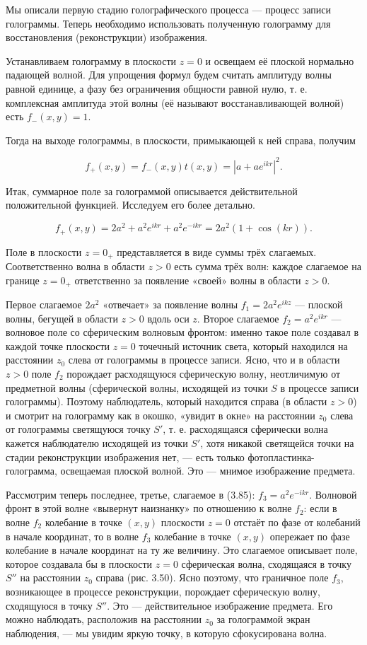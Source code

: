 \documentclass[a4paper,12pt]{article}
\begin{document}
Мы описали первую стадию голографического процесса — процесс записи голограммы. Теперь необходимо использовать полученную голограмму для восстановления (реконструкции) изображения.

Устанавливаем голограмму в плоскости \( z = 0 \) и освещаем её плоской нормально падающей волной. Для упрощения формул будем считать амплитуду волны равной единице, а фазу без ограничения общности равной нулю, т. е. комплексная амплитуда этой волны (её называют восстанавливающей волной) есть \( f_-(x,y) = 1 \).

Тогда на выходе голограммы, в плоскости, примыкающей к ней справа, получим

\[ f_+(x,y) = f_-(x,y) t(x,y) = |a + a e^{ikr}|^2. \]

Итак, суммарное поле за голограммой описывается действительной положительной функцией. Исследуем его более детально.

\[ f_+(x,y) = 2a^2 + a^2 e^{ikr} + a^2 e^{-ikr} = 2a^2 (1 + \cos(kr)). \]

Поле в плоскости \( z = 0_+ \) представляется в виде суммы трёх слагаемых. Соответственно волна в области \( z > 0 \) есть сумма трёх волн: каждое слагаемое на границе \( z = 0_+ \) ответственно за появление «своей» волны в области \( z > 0 \).

Первое слагаемое \( 2a^2 \) «отвечает» за появление волны \( f_1 = 2a^2 e^{ikz} \) — плоской волны, бегущей в области \( z > 0 \) вдоль оси \( z \). Второе слагаемое \( f_2 = a^2 e^{ikr} \) — волновое поле со сферическим волновым фронтом: именно такое поле создавал в каждой точке плоскости \( z = 0 \) точечный источник света, который находился на расстоянии \( z_0 \) слева от голограммы в процессе записи. Ясно, что и в области \( z > 0 \) поле \( f_2 \) порождает расходящуюся сферическую волну, неотличимую от предметной волны (сферической волны, исходящей из точки \( S \) в процессе записи голограммы). Поэтому наблюдатель, который находится справа (в области \( z > 0 \)) и смотрит на голограмму как в окошко, «увидит в окне» на расстоянии \( z_0 \) слева от голограммы светящуюся точку \( S' \), т. е. расходящаяся сферически волна кажется наблюдателю исходящей из точки \( S' \), хотя никакой светящейся точки на стадии реконструкции изображения нет, — есть только фотопластинка-голограмма, освещаемая плоской волной. Это — мнимое изображение предмета.

Рассмотрим теперь последнее, третье, слагаемое в (3.85): \( f_3 = a^2 e^{-ikr} \). Волновой фронт в этой волне «вывернут наизнанку» по отношению к волне \( f_2 \): если в волне \( f_2 \) колебание в точке \((x,y)\) плоскости \( z = 0 \) отстаёт по фазе от колебаний в начале координат, то в волне \( f_3 \) колебание в точке \((x,y)\) опережает по фазе колебание в начале координат на ту же величину. Это слагаемое описывает поле, которое создавала бы в плоскости \( z = 0 \) сферическая волна, сходящаяся в точку \( S'' \) на расстоянии \( z_0 \) справа (рис. 3.50). Ясно поэтому, что граничное поле \( f_3 \), возникающее в процессе реконструкции, порождает сферическую волну, сходящуюся в точку \( S'' \). Это — действительное изображение предмета. Его можно наблюдать, расположив на расстоянии \( z_0 \) за голограммой экран наблюдения, — мы увидим яркую точку, в которую сфокусирована волна.
\end{document}
